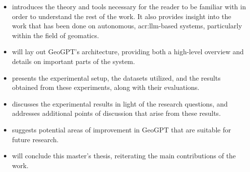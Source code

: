 \begin{itemize}
    \item {} introduces the theory and tools necessary for the reader to be familiar with in order to understand the rest of the work. It also provides insight into the work that has been done on autonomous, \acrshort{acr:llm}-based systems, particularly within the field of geomatics.
    \item {} will lay out GeoGPT's architecture, providing both a high-level overview and details on important parts of the system.
    \item {} presents the experimental setup, the datasets utilized, and the results obtained from these experiments, along with their evaluations.
    \item {} discusses the experimental results in light of the research questions, and addresses additional points of discussion that arise from these results.
    \item {} suggests potential areas of improvement in GeoGPT that are suitable for future research.
    \item {} will conclude this master's thesis, reiterating the main contributions of the work.
\end{itemize}


\glsresetall